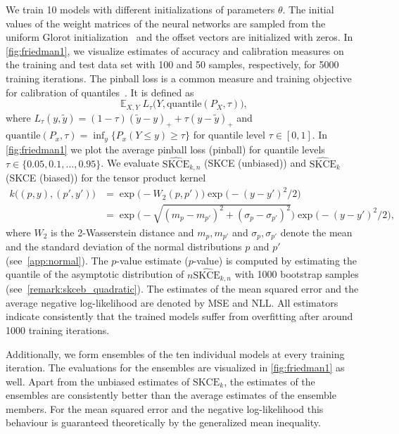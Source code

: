 \documentclass{article}
\DeclareMathOperator{\Exp}{\mathbb{E}}
\begin{document}
We train 10 models with different initializations of parameters $\theta$. The initial values
of the weight matrices of the neural networks are sampled from the uniform Glorot
initialization~\citep{Glorot2010} and the offset vectors are initialized with zeros.
In \cref{fig:friedman1}, we visualize estimates of accuracy and calibration measures
on the training and test data set with 100 and 50 samples, respectively, for
5000 training iterations. The pinball loss is a common measure and
training objective for calibration of quantiles~\citep{Song2019}. It is defined
as
\begin{equation*}
    \Exp_{X,Y} L_{\tau}\big(Y, \mathrm{quantile}(P_X, \tau)\big),
\end{equation*}
where $L_{\tau}(y, \tilde{y}) = (1 - \tau) (\tilde{y} - y)_{+} + \tau (y - \tilde{y})_{+}$
and $\mathrm{quantile}(P_x, \tau) = \inf_{y} \{P_x(Y \leq y) \geq \tau\}$ for
quantile level $\tau \in [0, 1]$.
In \cref{fig:friedman1} we plot the average pinball loss (pinball) for
quantile levels $\tau \in \{0.05, 0.1, \ldots, 0.95\}$. We evaluate
$\widehat{\mathrm{SKCE}}_{k,n}$ (SKCE (unbiased)) and $\widehat{\mathrm{SKCE}}_{k}$
(SKCE (biased)) for the tensor product kernel
\begin{equation*}
    \begin{split}
        k\big((p, y), (p', y')\big) &= \exp{\big(-W_2(p, p')\big)} \exp{\big(-(y - y')^2/2 \big)} \\
        &= \exp{\bigg(-\sqrt{(m_p - m_{p'})^2 + (\sigma_p - \sigma_{p'})^2}\bigg)} \exp{\big(- (y - y')^2/2\big)},
    \end{split}
\end{equation*}
where $W_2$ is the 2-Wasserstein distance and $m_p, m_{p'}$ and $\sigma_p, \sigma_{p'}$ denote
the mean and the standard deviation of the normal distributions $p$ and $p'$ (see~\cref{app:normal}).
The $p$-value estimate ($p$-value) is computed by estimating the quantile of the asymptotic distribution
of $n \widehat{\mathrm{SKCE}}_{k,n}$ with 1000 bootstrap samples
(see~\cref{remark:skceb_quadratic}). The estimates of the mean squared error
and the average negative log-likelihood are denoted by MSE and NLL.
All estimators indicate consistently that the trained models suffer from overfitting
after around 1000 training iterations.

Additionally, we form ensembles of the ten individual models at every training
iteration. The evaluations for the ensembles are visualized in \cref{fig:friedman1} as
well. Apart from the unbiased estimates of $\mathrm{SKCE}_k$, the estimates of the
ensembles are consistently better than the average estimates of the ensemble
members. For the mean squared error and the negative log-likelihood this behaviour
is guaranteed theoretically by the generalized mean inequality.
\end{document}
